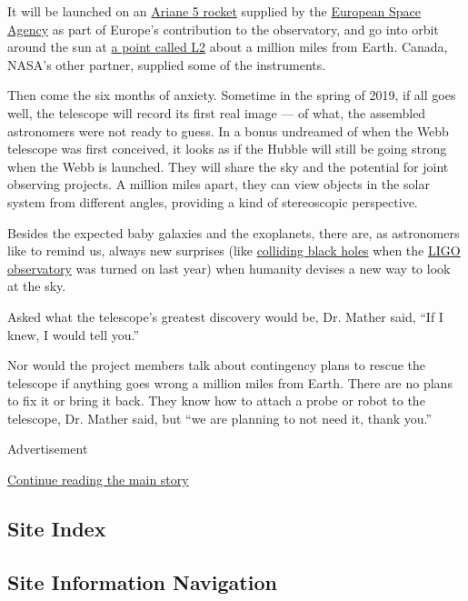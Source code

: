 It will be launched on an
\href{http://www.esa.int/Our_Activities/Launchers/Launch_vehicles/Ariane_5}{Ariane
5 rocket} supplied by the \href{http://www.esa.int/ESA}{European Space
Agency} as part of Europe's contribution to the observatory, and go into
orbit around the sun at \href{http://jwst.nasa.gov/orbit.html}{a point
called L2} about a million miles from Earth. Canada, NASA's other
partner, supplied some of the instruments.

Then come the six months of anxiety. Sometime in the spring of 2019, if
all goes well, the telescope will record its first real image --- of
what, the assembled astronomers were not ready to guess. In a bonus
undreamed of when the Webb telescope was first conceived, it looks as if
the Hubble will still be going strong when the Webb is launched. They
will share the sky and the potential for joint observing projects. A
million miles apart, they can view objects in the solar system from
different angles, providing a kind of stereoscopic perspective.

Besides the expected baby galaxies and the exoplanets, there are, as
astronomers like to remind us, always new surprises (like
\href{http://www.nytimes3xbfgragh.onion/2016/02/12/science/ligo-gravitational-waves-black-holes-einstein.html}{colliding
black holes} when the \href{http://ligo.org/}{LIGO observatory} was
turned on last year) when humanity devises a new way to look at the sky.

Asked what the telescope's greatest discovery would be, Dr. Mather said,
``If I knew, I would tell you.''

Nor would the project members talk about contingency plans to rescue the
telescope if anything goes wrong a million miles from Earth. There are
no plans to fix it or bring it back. They know how to attach a probe or
robot to the telescope, Dr. Mather said, but ``we are planning to not
need it, thank you.''

Advertisement

\protect\hyperlink{after-bottom}{Continue reading the main story}

\hypertarget{site-index}{%
\subsection{Site Index}\label{site-index}}

\hypertarget{site-information-navigation}{%
\subsection{Site Information
Navigation}\label{site-information-navigation}}

